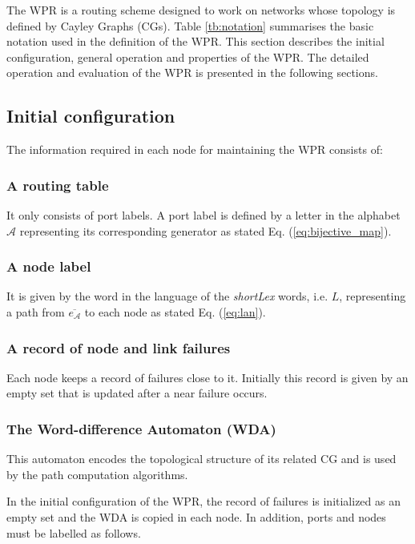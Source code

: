 The WPR is a routing scheme designed to work on networks whose topology is defined by Cayley Graphs (CGs). 
Table \ref{tb:notation} summarises the basic notation used in the definition of the WPR.
This section describes the initial configuration, general operation and properties of the WPR. The detailed operation and  evaluation of the WPR is presented in the following sections.



\subsection{Initial configuration}
\label{sec:init_conf}

The information required in each node for maintaining the WPR consists of: 

\subsubsection{A routing table} It only consists of port labels. A port label is defined by a letter in the alphabet $\mathcal{A}$ representing its corresponding  generator as stated Eq. (\ref{eq:bijective_map}).

\subsubsection{A node label} It is given by the word in the language of the \textit{shortLex} words, i.e. $L$, representing a path from $\overline{e_\mathcal{A}}$ to each node as stated Eq. (\ref{eq:lan}).

\subsubsection{A record of node and link failures} Each node keeps a record of failures close to it. Initially this record is given by an empty set that is updated after a near failure occurs.

\subsubsection{The Word-difference Automaton (WDA)} This automaton encodes the topological structure of its related CG and is used by the path computation algorithms.

In the initial configuration of the WPR, the record of failures is initialized as an empty set and the WDA is copied in each node. In addition, ports and nodes must be labelled as follows.

